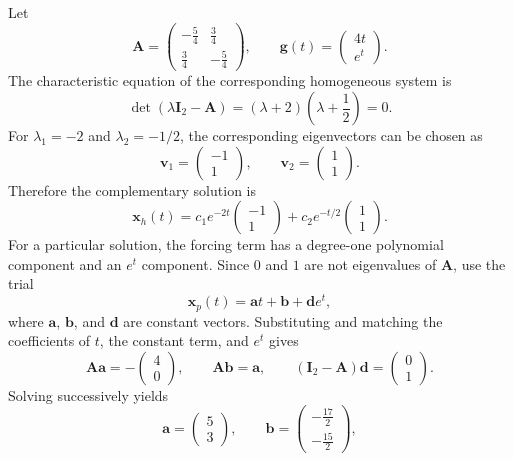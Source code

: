 \documentclass[11pt,oneside]{article}
\begin{document}
\begin{solution}
Let
\[
    \mathbf{A}=\begin{pmatrix}-\frac54&\frac34\\\frac34&-\frac54\end{pmatrix},
    \qquad
    \mathbf{g}(t)=\begin{pmatrix}4t\\e^t\end{pmatrix}.
\]
The characteristic equation of the corresponding homogeneous system is
\[
    \det(\lambda\mathbf{I}_2-\mathbf{A})
    =(\lambda+2)\left(\lambda+\frac12\right)=0.
\]
For $\lambda_1=-2$ and $\lambda_2=-1/2$, the corresponding eigenvectors can be chosen as
\[
    \mathbf{v}_1=\begin{pmatrix}-1\\1\end{pmatrix},
    \qquad
    \mathbf{v}_2=\begin{pmatrix}1\\1\end{pmatrix}.
\]
Therefore the complementary solution is
\[
    \mathbf{x}_h(t)
    =c_1e^{-2t}\begin{pmatrix}-1\\1\end{pmatrix}
    +c_2e^{-t/2}\begin{pmatrix}1\\1\end{pmatrix}.
\]
For a particular solution, the forcing term has a degree-one polynomial component and an $e^t$ component. Since $0$ and $1$ are not eigenvalues of $\mathbf{A}$, use the trial
\[
    \mathbf{x}_p(t)=\mathbf{a}t+\mathbf{b}+\mathbf{d}e^t,
\]
where $\mathbf{a}$, $\mathbf{b}$, and $\mathbf{d}$ are constant vectors. Substituting and matching the coefficients of $t$, the constant term, and $e^t$ gives
\[
    \mathbf{A}\mathbf{a}=-\begin{pmatrix}4\\0\end{pmatrix},
    \qquad
    \mathbf{A}\mathbf{b}=\mathbf{a},
    \qquad
    (\mathbf{I}_2-\mathbf{A})\mathbf{d}
        =\begin{pmatrix}0\\1\end{pmatrix}.
\]
Solving successively yields
\[
    \mathbf{a}=\begin{pmatrix}5\\3\end{pmatrix},
    \qquad
    \mathbf{b}=\begin{pmatrix}-\frac{17}{2}\\-\frac{15}{2}\end{pmatrix},
\]
\end{solution}
\end{document}
